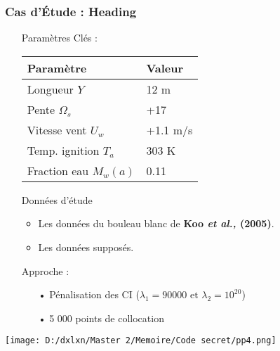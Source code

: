 \documentclass[handout]{beamer}
\newtheorem{pbm et hypo}[thm]{Problématique et hypothèses}
\begin{document}
	\begin{frame}
		\frametitle{Cas d'Étude : Heading}
		\begin{itemize}
			\item[\maltese] Paramètres Clés :
			\begin{table}[h]
				\scriptsize
				\begin{tabular}{@{}ll@{}}
					\toprule
					\textbf{Paramètre} & \textbf{Valeur} \\
					\midrule
					Longueur $Y$ & 12 m \\
					Pente $\Omega_s$ & +17\textdegree \\
					Vitesse vent $U_w$ & +1.1 m/s \\
					Temp. ignition $T_{a}$ & 303 K \\
					Fraction eau $M_w(a)$ & 0.11 \\
					\bottomrule
				\end{tabular}
			\end{table}
			
			\vspace{0.2cm}
			\item[\maltese] Données d'étude 
			\begin{itemize}
				\item Les données du bouleau blanc de \textbf{Koo \textit{et al.,} (2005)}.
				\item Les données supposés.
			\end{itemize} 
			
			\vspace{0.2cm}
			\item[\maltese] Approche : 
			\begin{itemize}
				\item[•] Pénalisation des CI ($\lambda_1 = 90 000 \text{ et } \lambda_2 = 10^{20}$)
				\item[•] 5 000 points de collocation
			\end{itemize}
		\end{itemize}
	\end{frame}
	
	
	\begin{frame}[plain]
		\noindent
		\texttt{[image: D:/dxlxn/Master 2/Memoire/Code secret/pp4.png]}
	\end{frame}
	
\end{document}
